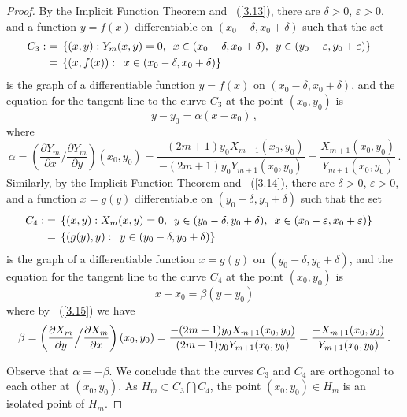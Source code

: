 \documentclass[10pt,a4paper]{amsart}
\begin{document}
\begin{proof}
By the Implicit Function Theorem and ~(\ref{3.13}), there are $\delta > 0$, $\varepsilon > 0$, and a function $y = f(x)$
differentiable on $(x_0-\delta,x_0+\delta)$ such that the set
\begin{equation} \notag \begin{split} C_3 : & = \,  \{(x,y): Y_m(x,y) = 0, \enskip x \in (x_0-\delta,x_0+\delta), \enskip y \in (y_0-\varepsilon,y_0+\varepsilon)\} \cr
& = \, \{(x,f(x)): \enskip x \in (x_0-\delta,x_0+\delta)\} \cr \end{split}
\end{equation}
is the graph of a differentiable function $y = f(x)$ on $(x_0-\delta,x_0+\delta)$, and the equation for the tangent line to the curve $C_3$ at the point $(x_0,y_0)$ is
$$y-y_0 = \alpha(x-x_0)\,,$$
where
$$ \alpha = \left( \frac{\partial{Y_m}}{\partial x} \Big / \frac{\partial{Y_m}}{{\partial y}} \right)(x_0,y_0)
= \frac{-(2m+1)y_0X_{m+1}(x_0,y_0)}{-(2m+1)y_0Y_{m+1}(x_0,y_0)} = \frac{X_{m+1}(x_0,y_0)}{Y_{m+1}(x_0,y_0)}\,.$$
Similarly, by the Implicit Function Theorem and ~(\ref{3.14}), there are $\delta > 0$, $\varepsilon > 0$, and a function $x = g(y)$ differentiable on
$(y_0-\delta,y_0+\delta)$ such that the set
\begin{equation} \notag \begin{split} C_4 : & = \, \{(x,y): X_m(x,y) = 0, \enskip y \in (y_0-\delta,y_0+\delta), \enskip x \in (x_0-\varepsilon,x_0+\varepsilon)\} \cr
& = \, \{(g(y),y): \enskip y \in (y_0-\delta,y_0+\delta)\} \cr \end{split}
\end{equation}
is the graph of a differentiable function $x = g(y)$ on $(y_0-\delta,y_0+\delta)$, and the equation for the tangent line to the curve $C_4$ at the point $(x_0,y_0)$ is
$$x-x_0 = \beta(y-y_0)$$
where by ~(\ref{3.15}) we have
\begin{equation} \notag \beta = \left( \frac{\partial{X_m}}{\partial y} \Big / \frac{\partial{X_m}}{{\partial x}} \right)(x_0,y_0)
= \frac{-(2m+1)y_0X_{m+1}(x_0,y_0)}{(2m+1)y_0Y_{m+1}(x_0,y_0)} = \frac{-X_{m+1}(x_0,y_0)}{Y_{m+1}(x_0,y_0)}\,.
\end{equation}

Observe that $\alpha = -\beta$. We conclude that the curves $C_3$ and $C_4$ are orthogonal to each other at $(x_0,y_0)$. As $H_m \subset C_3 \bigcap C_4$,
the point $(x_0,y_0) \in H_m$ is an isolated point of $H_m$.
\end{proof}
\end{document}
